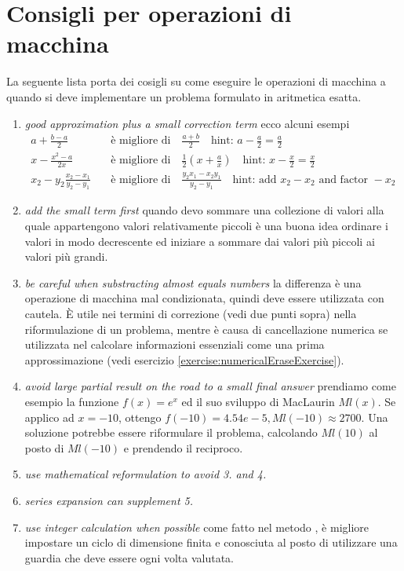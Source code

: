 \section{Consigli per operazioni di macchina}
La seguente lista porta dei cosigli su come eseguire le operazioni di macchina a
quando si deve implementare un problema formulato in aritmetica esatta.

\begin{enumerate}
\item \emph{good approximation plus a small correction term} ecco alcuni
esempi
\begin{displaymath}
\begin{split}
a + \frac{b - a}{2} \quad & \text{\`e migliore di} \quad \frac{a + b}{2} \quad
\text{hint: } a - \frac{a}{2} = \frac{a}{2} \\ 
x - \frac{x^{2} - a}{2x} \quad & \text{\`e migliore di} \quad \frac{1}{2}\left
(x + \frac{a}{x} \right ) \quad \text{hint: } x - \frac{x}{2} = \frac{x}{2} \\
x_{2} - y_{2} \frac{x_{2} - x_{1}}{y_{2} - y_{1}} \quad & \text{\`e migliore di}
\quad \frac{y_{2}x_{1} - x_{2}y_{1}}{y_{2} - y_{1}} \quad
\text{hint: add } x_{2} - x_{2} \text{ and factor } -x_{2}
\end{split}
\end{displaymath}
\item \emph{add the small term first} quando devo sommare una collezione di
valori alla quale appartengono valori relativamente piccoli \`e una buona idea ordinare
i valori in modo decrescente ed iniziare a sommare dai valori pi\`u piccoli ai
valori pi\`u grandi.
\item \emph{be careful when substracting almost equals numbers} la differenza
\`e una operazione di macchina mal condizionata, quindi deve essere utilizzata con
cautela. \`E utile nei termini di correzione (vedi due punti sopra) nella
riformulazione di un problema, mentre \`e causa di cancellazione numerica se
utilizzata nel calcolare informazioni essenziali come una prima approssimazione
(vedi esercizio \ref{exercise:numericalEraseExercise}).
\item \emph{avoid large partial result on the road to a small final answer}
prendiamo come esempio la funzione $f(x) = e^{x}$ ed il suo sviluppo di
MacLaurin  $Ml(x)$. Se applico ad $x = -10$, ottengo $f(-10) = 4.54e-5, Ml(-10) 
\approx 2700$. Una soluzione potrebbe essere riformulare il problema, calcolando
$Ml(10)$ al posto di $Ml(-10)$ e prendendo il reciproco.
\item \emph{use mathematical reformulation to avoid 3. and 4.}
\item \emph{series expansion can supplement 5.}
\item \emph{use integer calculation when possible} come fatto nel metodo
, \`e migliore impostare un ciclo di dimensione
finita e conosciuta al posto di utilizzare una guardia che deve essere ogni
volta valutata.
\end{enumerate}

